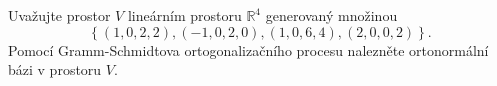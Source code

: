 Uvažujte prostor $V$ lineárním prostoru $\mathbb{R} ^{4}$ generovaný množinou
$$\left \{ \left ( 1,0,2,2 \right ),\left ( -1,0,2,0 \right ),\left ( 1,0,6,4
\right ),\left (2,0,0,2  \right ) \right \}.$$ Pomocí Gramm-Schmidtova
ortogonalizačního procesu nalezněte ortonormální bázi v prostoru $V$.

